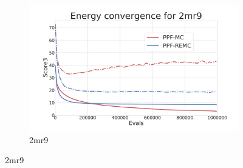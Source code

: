 \begin{figure}[ht]\ContinuedFloat
  \begin{subfigure}{0.7\linewidth}
    \centering
    \includegraphics[width=1\linewidth]{Figuras/plots/energy_convergence/energy_convergence_2mr9.pdf}
    \caption{2mr9}
  \end{subfigure}
\end{figure}

